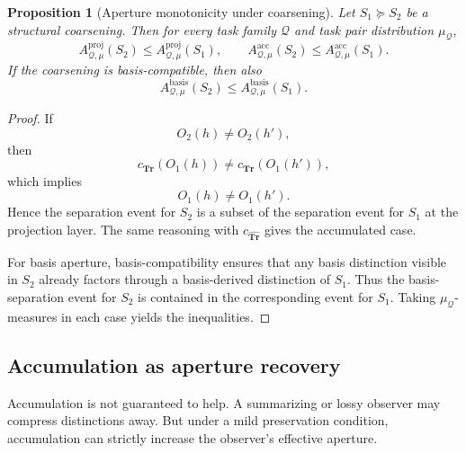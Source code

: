 \documentclass[11pt,twoside]{article}
\newtheorem{proposition}[theorem]{Proposition}
\theoremstyle{definition}
\newcommand{\Tr}{\mathbf{Tr}}
\newcommand{\proj}{\mathrm{proj}}
\newcommand{\basis}{\mathrm{basis}}
\newcommand{\acc}{\mathrm{acc}}
\begin{document}
\begin{proposition}[Aperture monotonicity under coarsening]
\label{prop:aperture-monotonicity}
Let \(S_1 \succeq S_2\) be a structural coarsening. Then for every task family \(\mathcal{Q}\) and task pair distribution \(\mu_{\mathcal{Q}}\),
\[
  A^{\proj}_{\mathcal{Q},\mu}(S_2)
  \le
  A^{\proj}_{\mathcal{Q},\mu}(S_1),
  \qquad
  A^{\acc}_{\mathcal{Q},\mu}(S_2)
  \le
  A^{\acc}_{\mathcal{Q},\mu}(S_1).
\]
If the coarsening is basis-compatible, then also
\[
  A^{\basis}_{\mathcal{Q},\mu}(S_2)
  \le
  A^{\basis}_{\mathcal{Q},\mu}(S_1).
\]
\end{proposition}

\begin{proof}
If
\[
  O_2(h) \neq O_2(h'),
\]
then
\[
  c_{\Tr}(O_1(h)) \neq c_{\Tr}(O_1(h')),
\]
which implies
\[
  O_1(h)\neq O_1(h').
\]
Hence the separation event for \(S_2\) is a subset of the separation event for \(S_1\) at the projection layer. The same reasoning with \(c_{\widehat{\Tr}}\) gives the accumulated case.

For basis aperture, basis-compatibility ensures that any basis distinction visible in \(S_2\) already factors through a basis-derived distinction of \(S_1\). Thus the basis-separation event for \(S_2\) is contained in the corresponding event for \(S_1\). Taking \(\mu_{\mathcal{Q}}\)-measures in each case yields the inequalities.
\end{proof}

\subsection{Accumulation as aperture recovery}
\label{subsec:accumulation-as-aperture-recovery}

Accumulation is not guaranteed to help. A summarizing or lossy observer may compress distinctions away. But under a mild preservation condition, accumulation can strictly increase the observer's effective aperture.
\end{document}

